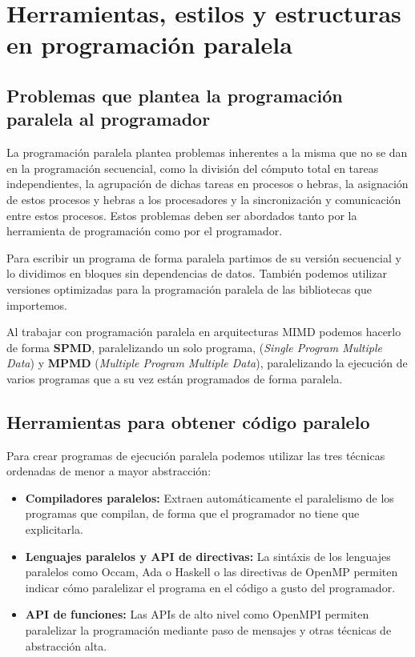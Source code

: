 \section{Herramientas, estilos y estructuras en programación paralela}\label{herramientas-progpar}

\subsection{Problemas que plantea la programación paralela al programador}\label{problemas-progpar}

La programación paralela plantea problemas inherentes a la misma que no se dan en la programación secuencial, como la división del cómputo total en tareas independientes, la agrupación de dichas tareas en procesos o hebras, la asignación de estos procesos y hebras a los procesadores y la sincronización y comunicación entre estos procesos.
Estos problemas deben ser abordados tanto por la herramienta de programación como por el programador.

Para escribir un programa de forma paralela partimos de su versión secuencial y lo dividimos en bloques sin dependencias de datos.
También podemos utilizar versiones optimizadas para la programación paralela de las bibliotecas que importemos.

Al trabajar con programación paralela en arquitecturas MIMD podemos hacerlo de forma \textbf{SPMD}, paralelizando un solo programa, (\textit{Single Program Multiple Data}) y \textbf{MPMD} (\textit{Multiple Program Multiple Data}), paralelizando la ejecución de varios programas que a su vez están programados de forma paralela.

\subsection{Herramientas para obtener código paralelo}\label{herramientas-codigo-par}

Para crear programas de ejecución paralela podemos utilizar las tres técnicas ordenadas de menor a mayor abstracción:

\begin{itemize}
	\item\textbf{Compiladores paralelos:} Extraen automáticamente el paralelismo de los programas que compilan, de forma que el programador no tiene que explicitarla.
	\item\textbf{Lenguajes paralelos y API de directivas:} La sintáxis de los lenguajes paralelos como Occam, Ada o Haskell o las directivas de OpenMP permiten indicar cómo paralelizar el programa en el código a gusto del programador.
	\item\textbf{API de funciones:} Las APIs de alto nivel como OpenMPI permiten paralelizar la programación mediante paso de mensajes y otras técnicas de abstracción alta.
\end{itemize}

